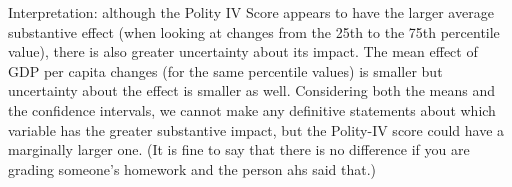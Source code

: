 \documentclass[12pt]{article}\usepackage[]{graphicx}\usepackage[]{color}
\begin{document}
Interpretation: although the Polity IV Score appears to have the larger average substantive effect (when looking at changes from the 25th to the 75th percentile value), there is also greater uncertainty about its impact. The mean effect of GDP per capita changes (for the same percentile values) is smaller but uncertainty about the effect is smaller as well. Considering both the means and the confidence intervals, we cannot make any definitive statements about which variable has the greater substantive impact, but the Polity-IV score could have a marginally larger one. (It is fine to say that there is no difference if you are grading someone's homework and the person ahs said that.)
\end{document}
